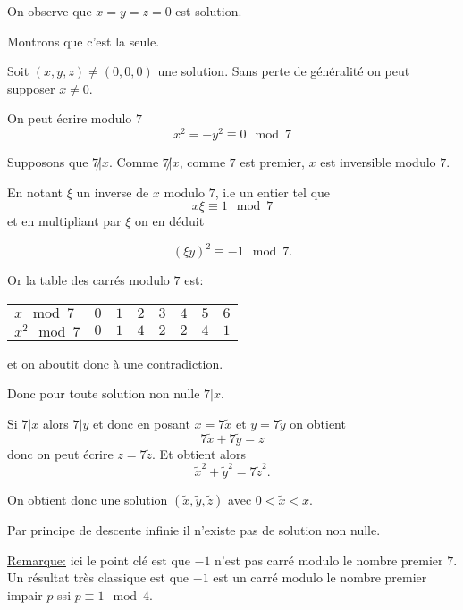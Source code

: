 \begin{sol}
  On observe que $x=y=z=0$ est solution.

  Montrons que c'est la seule.


  Soit $(x,y,z) \neq (0,0,0)$ une solution. Sans perte de généralité on peut supposer $x \neq 0$.




  On peut écrire modulo $7$
  \[x^2 = - y^2 \equiv 0 \mod 7\]


  Supposons que $7 \not| x$.
  Comme $7 \not| x$, comme $7$ est premier, $x$ est inversible modulo $7$.

  En notant $\xi$ un inverse de $x$ modulo $7$, i.e un entier tel que
  \[x \xi \equiv 1 \mod 7\]
  et en multipliant par $\xi$ on en déduit

  \[(\xi y)^2 \equiv -1 \mod 7.\]


  Or la table des carrés modulo $7$ est:


  \begin{center}
    \begin{tabular}{|l|c|c|c|c|c|c|c|}
      \hline
      $x \mod 7$   & $0$ & $1$ & $2$ & $3$ & $4$ & $5$ & $6$ \\
      \hline
      $x^2 \mod 7$ & $0$ & $1$ & $4$ & $2$ & $2$ & $4$ & $1$ \\
      \hline
    \end{tabular}
  \end{center}
  et on aboutit donc à une contradiction.


  Donc pour toute solution non nulle $7 | x$.

  Si $7 | x$ alors $7 | y$ et donc en posant $x = 7 \tilde{x}$ et $y= 7 \tilde{y}$ on obtient
  \[7 \tilde{x} + 7 \tilde{y} =  z\]
  donc on peut écrire $z = 7 \tilde{z}$. Et obtient alors
  \[\tilde{x}^2 + \tilde{y}^2 = 7 \tilde{z}^2.\]

  On obtient donc une solution $(\tilde{x},\tilde{y},\tilde{z})$ avec $0 < \tilde{x} < x$.

  Par principe de descente infinie il n'existe pas de solution non nulle.

  \underline{Remarque:} ici le point clé est que $-1$ n'est pas carré modulo le nombre premier $7$. Un résultat très classique est que $-1$ est un carré modulo le nombre premier impair $p$ ssi $p \equiv 1 \mod 4$.
\end{sol}